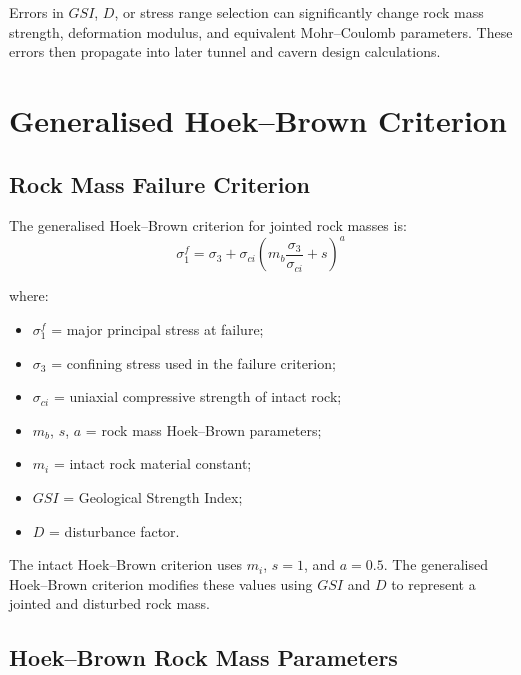 \documentclass[a4paper,12pt]{article}
\begin{document}
\begin{warnbox}
Errors in \(GSI\), \(D\), or stress range selection can significantly change rock mass
strength, deformation modulus, and equivalent Mohr--Coulomb parameters. These errors
then propagate into later tunnel and cavern design calculations.
\end{warnbox}

\section{Generalised Hoek--Brown Criterion}

\subsection{Rock Mass Failure Criterion}

The generalised Hoek--Brown criterion for jointed rock masses is:
\[
\sigma_1^f =
\sigma_3 +
\sigma_{ci}
\left(
m_b\frac{\sigma_3}{\sigma_{ci}} + s
\right)^a
\]

where:
\begin{itemize}
    \item \(\sigma_1^f\) = major principal stress at failure;
    \item \(\sigma_3\) = confining stress used in the failure criterion;
    \item \(\sigma_{ci}\) = uniaxial compressive strength of intact rock;
    \item \(m_b\), \(s\), \(a\) = rock mass Hoek--Brown parameters;
    \item \(m_i\) = intact rock material constant;
    \item \(GSI\) = Geological Strength Index;
    \item \(D\) = disturbance factor.
\end{itemize}

\begin{keybox}
The intact Hoek--Brown criterion uses \(m_i\), \(s=1\), and \(a=0.5\).  
The generalised Hoek--Brown criterion modifies these values using \(GSI\) and \(D\)
to represent a jointed and disturbed rock mass.
\end{keybox}

\subsection{Hoek--Brown Rock Mass Parameters}
\end{document}
